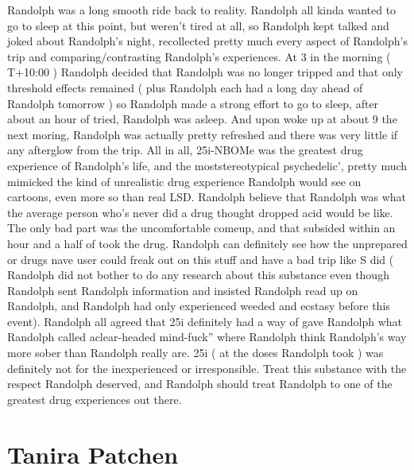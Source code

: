 \documentclass[12pt]{book}
\begin{document}
Randolph was a long smooth ride back to reality. Randolph all kinda wanted to go to sleep at this point, but weren't tired at all, so Randolph kept talked and joked about Randolph's night, recollected pretty much every aspect of Randolph's trip and comparing/contrasting Randolph's experiences. At 3 in the morning ( T+10:00 ) Randolph decided that Randolph was no longer tripped and that only threshold effects remained ( plus Randolph each had a long day ahead of Randolph tomorrow ) so Randolph made a strong effort to go to sleep, after about an hour of tried, Randolph was asleep. And upon woke up at about 9 the next moring, Randolph was actually pretty refreshed and there was very little if any afterglow from the trip. All in all, 25i-NBOMe was the greatest drug experience of Randolph's life, and the moststereotypical psychedelic', pretty much mimicked the kind of unrealistic drug experience Randolph would see on cartoons, even more so than real LSD. Randolph believe that Randolph was what the average person who's never did a drug thought dropped acid would be like. The only bad part was the uncomfortable comeup, and that subsided within an hour and a half of took the drug. Randolph can definitely see how the unprepared or drugs nave user could freak out on this stuff and have a bad trip like S did ( Randolph did not bother to do any research about this substance even though Randolph sent Randolph information and insisted Randolph read up on Randolph, and Randolph had only experienced weeded and ecstasy before this event). Randolph all agreed that 25i definitely had a way of gave Randolph what Randolph called aclear-headed mind-fuck'' where Randolph think Randolph's way more sober than Randolph really are. 25i ( at the doses Randolph took ) was definitely not for the inexperienced or irresponsible. Treat this substance with the respect Randolph deserved, and Randolph should treat Randolph to one of the greatest drug experiences out there.



\chapter{Tanira Patchen}
\end{document}

